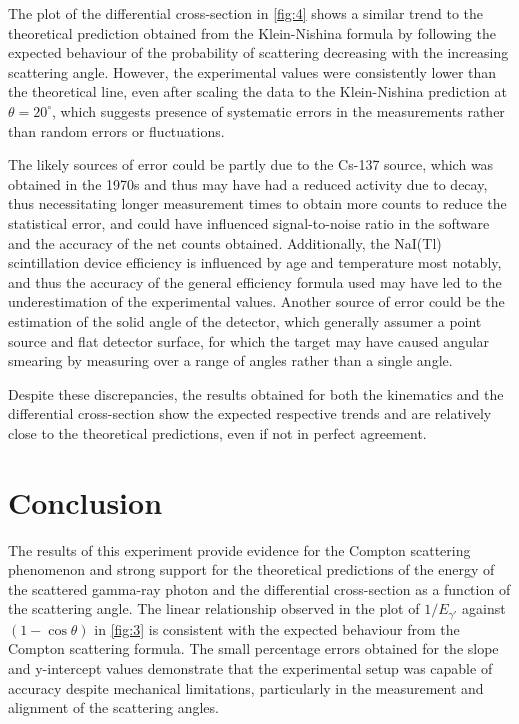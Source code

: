 \documentclass[11pt, a4paper, twocolumn]{article}
\begin{document}
The plot of the differential cross-section in \autoref{fig:4} shows a similar trend to the theoretical prediction obtained from the Klein-Nishina formula by following the expected behaviour of the probability of scattering decreasing with the increasing scattering angle. However, the experimental values were consistently lower than the theoretical line, even after scaling the data to the Klein-Nishina prediction at $\theta=20^{\circ}$, which suggests presence of systematic errors in the measurements rather than random errors or fluctuations.

The likely sources of error could be partly due to the Cs-137 source, which was obtained in the 1970s and thus may have had a reduced activity due to decay, thus necessitating longer measurement times to obtain more counts to reduce the statistical error, and could have influenced signal-to-noise ratio in the software and the accuracy of the net counts obtained. Additionally, the NaI(Tl) scintillation device efficiency is influenced by age and temperature most notably, and thus the accuracy of the general efficiency formula used may have led to the underestimation of the experimental values. Another source of error could be the estimation of the solid angle of the detector, which generally assumer a point source and flat detector surface, for which the target may have caused angular smearing by measuring over a range of angles rather than a single angle.

Despite these discrepancies, the results obtained for both the kinematics and the differential cross-section show the expected respective trends and are relatively close to the theoretical predictions, even if not in perfect agreement.

\section{Conclusion}

The results of this experiment provide evidence for the Compton scattering phenomenon and strong support for the theoretical predictions of the energy of the scattered gamma-ray photon and the differential cross-section as a function of the scattering angle. The linear relationship observed in the plot of $1/E_{\gamma'}$ against $(1-\cos\theta)$ in \autoref{fig:3} is consistent with the expected behaviour from the Compton scattering formula. The small percentage errors obtained for the slope and y-intercept values demonstrate that the experimental setup was capable of accuracy despite mechanical limitations, particularly in the measurement and alignment of the scattering angles.
\end{document}
